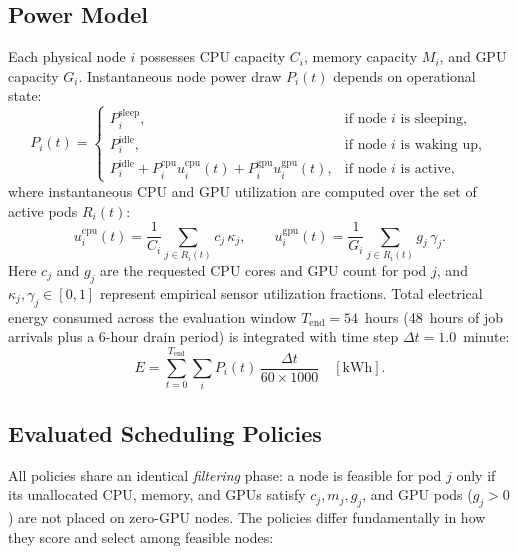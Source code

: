 \documentclass[a4paper,fleqn]{cas-dc}
\begin{document}
\subsection{Power Model}
Each physical node $i$ possesses CPU capacity $C_i$, memory capacity $M_i$, and GPU capacity $G_i$. Instantaneous node power draw $P_i(t)$ depends on operational state:
\begin{equation}
P_i(t) = \begin{cases}
P_i^{\mathrm{sleep}}, & \text{if node } i \text{ is sleeping}, \\
P_i^{\mathrm{idle}}, & \text{if node } i \text{ is waking up}, \\
P_i^{\mathrm{idle}} + P_i^{\mathrm{cpu}} u_i^{\mathrm{cpu}}(t) + P_i^{\mathrm{gpu}} u_i^{\mathrm{gpu}}(t), & \text{if node } i \text{ is active},
\end{cases}
\label{eq:power}
\end{equation}
where instantaneous CPU and GPU utilization are computed over the set of active pods $R_i(t)$:
\begin{equation}
u_i^{\mathrm{cpu}}(t) = \frac{1}{C_i}\sum_{j\in R_i(t)} c_j\,\kappa_j, \qquad
u_i^{\mathrm{gpu}}(t) = \frac{1}{G_i}\sum_{j\in R_i(t)} g_j\,\gamma_j.
\label{eq:util}
\end{equation}
Here $c_j$ and $g_j$ are the requested CPU cores and GPU count for pod $j$, and $\kappa_j, \gamma_j \in [0, 1]$ represent empirical sensor utilization fractions. Total electrical energy consumed across the evaluation window $T_{\mathrm{end}} = 54$~hours (48~hours of job arrivals plus a 6-hour drain period) is integrated with time step $\Delta t = 1.0$~minute:
\begin{equation}
E = \sum_{t=0}^{T_{\mathrm{end}}}\sum_{i} P_i(t)\,\frac{\Delta t}{60 \times 1000} \quad [\mathrm{kWh}].
\label{eq:energy}
\end{equation}

\subsection{Evaluated Scheduling Policies}
All policies share an identical \emph{filtering} phase: a node is feasible for pod $j$ only if its unallocated CPU, memory, and GPUs satisfy $c_j, m_j, g_j$, and GPU pods ($g_j > 0$) are not placed on zero-GPU nodes. The policies differ fundamentally in how they score and select among feasible nodes:
\end{document}
